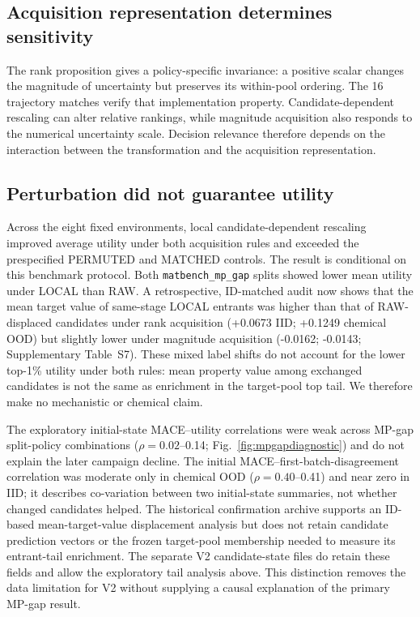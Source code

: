 \documentclass[11pt]{article}
\newcommand{\code}[1]{\texttt{#1}}
\begin{document}
\subsection{Acquisition representation determines sensitivity}
The rank proposition gives a policy-specific invariance: a positive scalar changes the magnitude of uncertainty but preserves its within-pool ordering. The 16 trajectory matches verify that implementation property. Candidate-dependent rescaling can alter relative rankings, while magnitude acquisition also responds to the numerical uncertainty scale. Decision relevance therefore depends on the interaction between the transformation and the acquisition representation.

\subsection{Perturbation did not guarantee utility}
Across the eight fixed environments, local candidate-dependent rescaling improved average utility under both acquisition rules and exceeded the prespecified PERMUTED and MATCHED controls. The result is conditional on this benchmark protocol. Both \code{matbench\_mp\_gap} splits showed lower mean utility under LOCAL than RAW. A retrospective, ID-matched audit now shows that the mean target value of same-stage LOCAL entrants was higher than that of RAW-displaced candidates under rank acquisition (+0.0673 IID; +0.1249 chemical OOD) but slightly lower under magnitude acquisition (-0.0162; -0.0143; Supplementary Table~S7). These mixed label shifts do not account for the lower top-1\% utility under both rules: mean property value among exchanged candidates is not the same as enrichment in the target-pool top tail. We therefore make no mechanistic or chemical claim.

The exploratory initial-state MACE--utility correlations were weak across MP-gap split-policy combinations (\(\rho=0.02\)--0.14; Fig.~\ref{fig:mpgapdiagnostic}) and do not explain the later campaign decline. The initial MACE--first-batch-disagreement correlation was moderate only in chemical OOD (\(\rho=0.40\)--0.41) and near zero in IID; it describes co-variation between two initial-state summaries, not whether changed candidates helped. The historical confirmation archive supports an ID-based mean-target-value displacement analysis but does not retain candidate prediction vectors or the frozen target-pool membership needed to measure its entrant-tail enrichment. The separate V2 candidate-state files do retain these fields and allow the exploratory tail analysis above. This distinction removes the data limitation for V2 without supplying a causal explanation of the primary MP-gap result.
\end{document}
